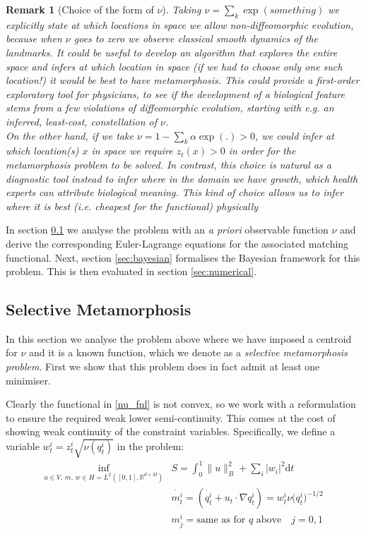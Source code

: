 \documentclass{article}
\newtheorem{remark}{Remark}
\newcommand{\norm}[2]{\| #1 \|_{ #2 }}
\newcommand{\bnorm}[1]{\norm{ #1 }{B}}
\newcommand{\diff}[1]{\text{d} #1}
\newcommand{\RdM}{\mathbb{R}^{d\times M}}
\begin{document}
\begin{remark}[Choice of the form of $\nu$]
Taking $\nu = \sum_k \exp(something)$ we explicitly state at which locations in
space we allow non-diffeomorphic evolution, because when $\nu$ goes to zero we
observe classical smooth dynamics of the landmarks. It could be useful to
develop an algorithm that explores the entire space and infers at which location
in space (if we had to choose only one such location!) it would be best to have
metamorphosis. This could provide a first-order exploratory tool for physicians,
to see if the development of a biological feature stems from a few violations of
diffeomorphic evolution, starting with e.g. an inferred, least-cost,
constellation of $\nu$.\\

On the other hand, if we take $\nu =1 - \sum_k \alpha \exp(.)>0$, we could infer
at which location(s) $x$ in space we require $z_t(x)>0$ in order for the
metamorphosis problem to be solved. In contrast, this choice is natural as a
diagnostic tool instead to infer where in the domain we have growth, which
health experts can attribute biological meaning. This kind of choice allows us
to infer where it is best (i.e. cheapest for the functional) \emph{physically}
\end{remark}

In section \ref{sec:select_mm} we analyse the problem with an \emph{a priori}
observable function $\nu$ and derive the corresponding Euler-Lagrange equations
for the associated matching functional. Next, section \ref{sec:bayesian}
formalises the Bayesian framework for this problem. This is then evaluated in
section \ref{sec:numerical}.

\subsection{Selective Metamorphosis}\label{sec:select_mm}

In this section we analyse the problem above where we have imposed a centroid
for $\nu$ and it is a known function, which we denote as a \emph{selective
metamorphosis problem}. First we show that this problem does in fact admit at
least one minimiser.

Clearly the functional in \eqref{nu_fnl} is not convex, so we work with a
reformulation to ensure the required weak lower semi-continuity. This comes at
the cost of showing weak continuity of the constraint variables. Specifically,
we define a variable $w^i_t = z^i_t \sqrt{\nu(q_t^i)}$ in the problem:
\begin{subequations}
\begin{align}
\inf_{u\in V,\,m,\, w \in H=L^2([0,1],\RdM)} & S = \int_0^1\bnorm{u}^2 + \sum_i |w_i|^2 \diff{t}\\
            & \dot{m^i_t} = (\dot{q^i_t} + u_t \cdot \nabla q^i_t) = w^i_t
            {\nu(q_t^i})^{-1/2}\\
            & m^i_j = \text{same as for $q$ above}\quad j=0,1
\end{align}
\end{subequations}
\end{document}
